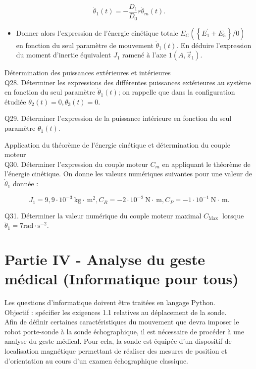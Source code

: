 $$
\dot{\theta}_{1}(t)=-\frac{D_{1}}{D_{0}} r \dot{\theta}_{m}(t) .
$$

\begin{itemize}
  \item[Q27.] Donner alors l'expression de l'énergie cinétique totale $E_{C}\left(\left\{E_{1}^{\prime}+E_{5}\right\} / 0\right)$ en fonction du seul paramètre de mouvement $\dot{\theta}_{1}(t)$. En déduire l'expression du moment d'inertie équivalent $J_{1}$ ramené à l'axe $1\left(A, \vec{z}_{1}\right)$.
\end{itemize}

Détermination des puissances extérieures et intérieures\\
Q28. Déterminer les expressions des différentes puissances extérieures au système en fonction du seul paramètre $\dot{\theta}_{1}(t)$; on rappelle que dans la configuration étudiée $\theta_{2}(t)=0, \theta_{3}(t)=0$.

Q29. Déterminer l'expression de la puissance intérieure en fonction du seul paramètre $\dot{\theta}_{1}(t)$.

Application du théorème de l'énergie cinétique et détermination du couple moteur\\
Q30. Déterminer l'expression du couple moteur $C_{m}$ en appliquant le théorème de l'énergie cinétique. On donne les valeurs numériques suivantes pour une valeur de $\dot{\theta}_{1}$ donnée :

$$
J_{1}=9,9 \cdot 10^{-3} \mathrm{~kg} \cdot \mathrm{~m}^{2}, C_{R}=-2 \cdot 10^{-2} \mathrm{~N} \cdot \mathrm{~m}, C_{P}=-1 \cdot 10^{-1} \mathrm{~N} \cdot \mathrm{~m} .
$$

Q31. Déterminer la valeur numérique du couple moteur maximal $C_{\text {Max }}$ lorsque $\ddot{\theta}_{1}=7 \mathrm{rad} \cdot \mathrm{s}^{-2}$.

\section*{Partie IV - Analyse du geste médical (Informatique pour tous)}
Les questions d'informatique doivent être traitées en langage Python.\\
Objectif : spécifier les exigences 1.1 relatives au déplacement de la sonde.\\
Afin de définir certaines caractéristiques du mouvement que devra imposer le robot porte-sonde à la sonde échographique, il est nécessaire de procéder à une analyse du geste médical. Pour cela, la sonde est équipée d'un dispositif de localisation magnétique permettant de réaliser des mesures de position et d'orientation au cours d'un examen échographique classique.

